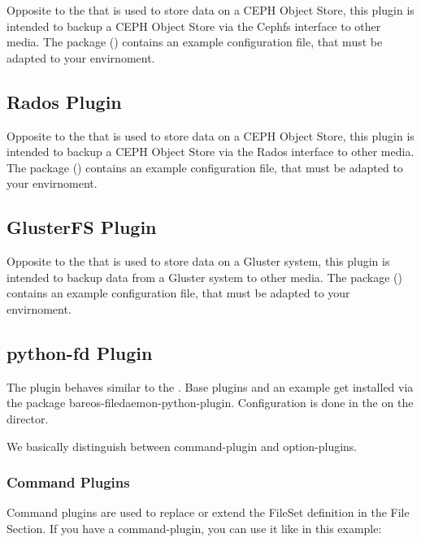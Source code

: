 Opposite to the  that is used to store data on a CEPH Object Store,
this plugin is intended to backup a CEPH Object Store via the Cephfs interface to other media.
The package  () contains an example configuration file, that must be adapted to your envirnoment.

\subsection{Rados Plugin}

Opposite to the  that is used to store data on a CEPH Object Store,
this plugin is intended to backup a CEPH Object Store via the Rados interface to other media.
The package  () contains an example configuration file, that must be adapted to your envirnoment.


\subsection{GlusterFS Plugin}

Opposite to the  that is used to store data on a Gluster system,
this plugin is intended to backup data from a Gluster system to other media.
The package  () contains an example configuration file, that must be adapted to your envirnoment.


\subsection{python-fd Plugin}

The  plugin behaves similar to the . Base plugins and an example get installed via the package bareos-filedaemon-python-plugin.
Configuration is done in the  on the director.

We basically distinguish between command-plugin and option-plugins. 

\subsubsection{Command Plugins}
Command plugins are used to replace or extend the FileSet definition in the File Section. If you have a command-plugin, 
you can use it like in this example:

